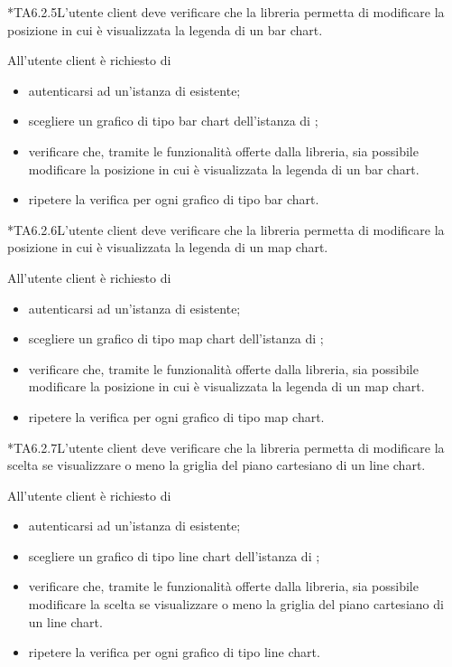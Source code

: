 	*{TA6.2.5}L'utente client deve verificare che la libreria permetta di modificare la posizione in cui è visualizzata la legenda di un bar chart.
		
		All'utente client è richiesto di
		\begin{itemize}
			\item autenticarsi ad un'istanza di \projectname{} esistente;
			\item scegliere un grafico di tipo bar chart dell'istanza di \projectname{};
			\item verificare che, tramite le funzionalità offerte dalla libreria, sia possibile modificare la posizione in cui è visualizzata la legenda di un bar chart.
			\item ripetere la verifica per ogni grafico di tipo bar chart.
		\end{itemize}

	*{TA6.2.6}L'utente client deve verificare che la libreria permetta di modificare la posizione in cui è visualizzata la legenda di un map chart.
		
		All'utente client è richiesto di
		\begin{itemize}
			\item autenticarsi ad un'istanza di \projectname{} esistente;
			\item scegliere un grafico di tipo map chart dell'istanza di \projectname{};
			\item verificare che, tramite le funzionalità offerte dalla libreria, sia possibile modificare la posizione in cui è visualizzata la legenda di un map chart.
			\item ripetere la verifica per ogni grafico di tipo map chart.
		\end{itemize}

	*{TA6.2.7}L'utente client deve verificare che la libreria permetta di modificare la scelta se visualizzare o meno la griglia del piano cartesiano di un line chart.
		
		All'utente client è richiesto di
		\begin{itemize}
			\item autenticarsi ad un'istanza di \projectname{} esistente;
			\item scegliere un grafico di tipo line chart dell'istanza di \projectname{};
			\item verificare che, tramite le funzionalità offerte dalla libreria, sia possibile modificare la scelta se visualizzare o meno la griglia del piano cartesiano di un line chart.
			\item ripetere la verifica per ogni grafico di tipo line chart.
		\end{itemize}

